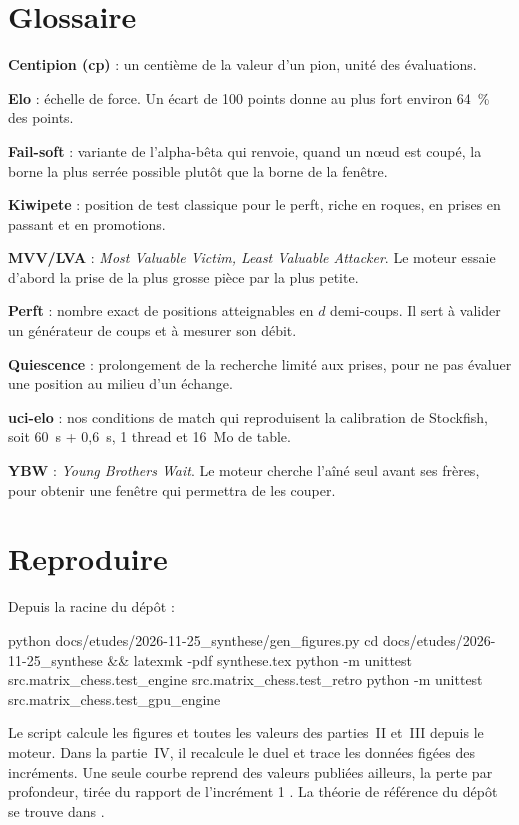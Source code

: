 \documentclass[11pt,a4paper]{article}
\newcounter{calcul}
\theoremstyle{plain}
\begin{document}
\section{Glossaire}
\textbf{Centipion (cp)} : un centième de la valeur d'un pion, unité des évaluations.

\textbf{Elo} : échelle de force. Un écart de 100 points donne au plus fort environ 64~\% des
points.

\textbf{Fail-soft} : variante de l'alpha-bêta qui renvoie, quand un nœud est coupé, la borne la
plus serrée possible plutôt que la borne de la fenêtre.

\textbf{Kiwipete} : position de test classique pour le perft, riche en roques, en prises en
passant et en promotions.

\textbf{MVV/LVA} : \emph{Most Valuable Victim, Least Valuable Attacker}. Le moteur essaie d'abord
la prise de la plus grosse pièce par la plus petite.

\textbf{Perft} : nombre exact de positions atteignables en $d$ demi-coups. Il sert à valider un
générateur de coups et à mesurer son débit.

\textbf{Quiescence} : prolongement de la recherche limité aux prises, pour ne pas évaluer une
position au milieu d'un échange.

\textbf{uci-elo} : nos conditions de match qui reproduisent la calibration de Stockfish, soit
60~s + 0,6~s, 1 thread et 16~Mo de table.

\textbf{YBW} : \emph{Young Brothers Wait}. Le moteur cherche l'aîné seul avant ses frères, pour
obtenir une fenêtre qui permettra de les couper.

\section{Reproduire}
Depuis la racine du dépôt :
\begin{python}
python docs/etudes/2026-11-25_synthese/gen_figures.py
cd docs/etudes/2026-11-25_synthese && latexmk -pdf synthese.tex
python -m unittest src.matrix_chess.test_engine src.matrix_chess.test_retro
python -m unittest src.matrix_chess.test_gpu_engine
\end{python}
Le script calcule les figures et toutes les valeurs des parties~II et~III depuis le moteur. Dans la
partie~IV, il recalcule le duel et trace les données figées des incréments. Une seule courbe
reprend des valeurs publiées ailleurs, la perte par profondeur, tirée du rapport de l'incrément 1
\cite{inc1}. La théorie de référence du dépôt se trouve dans \cite{theorie}.
\end{document}
